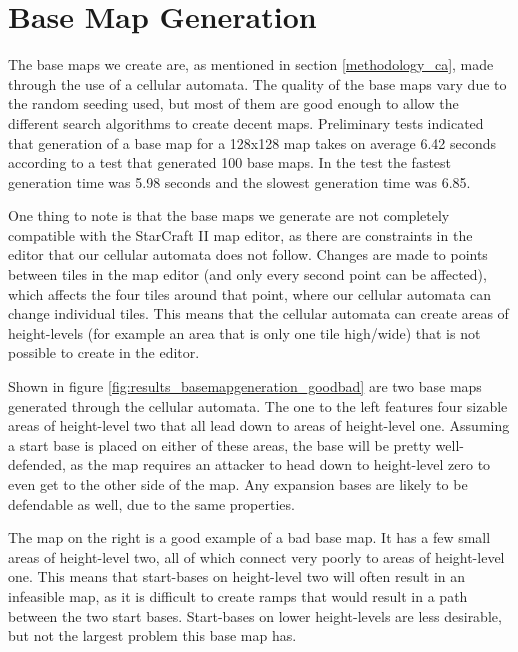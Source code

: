 \section{Base Map Generation}
\label{results_basemapgeneration}

The base maps we create are, as mentioned in section \ref{methodology_ca}, made through the use of a cellular automata. The quality of the base maps vary due to the random seeding used, but most of them are good enough to allow the different search algorithms to create decent maps. Preliminary tests indicated that generation of a base map for a 128x128 map takes on average 6.42 seconds according to a test that generated 100 base maps. In the test the fastest generation time was 5.98 seconds and the slowest generation time was 6.85.

One thing to note is that the base maps we generate are not completely compatible with the StarCraft II map editor, as there are constraints in the editor that our cellular automata does not follow. Changes are made to points between tiles in the map editor (and only every second point can be affected), which affects the four tiles around that point, where our cellular automata can change individual tiles. This means that the cellular automata can create areas of height-levels (for example an area that is only one tile high/wide) that is not possible to create in the editor.


Shown in figure \ref{fig:results_basemapgeneration_goodbad} are two base maps generated through the cellular automata. The one to the left features four sizable areas of height-level two that all lead down to areas of height-level one. Assuming a start base is placed on either of these areas, the base will be pretty well-defended, as the map requires an attacker to head down to height-level zero to even get to the other side of the map. Any expansion bases are likely to be defendable as well, due to the same properties.

The map on the right is a good example of a bad base map. It has a few small areas of height-level two, all of which connect very poorly to areas of height-level one. This means that start-bases on height-level two will often result in an infeasible map, as it is difficult to create ramps that would result in a path between the two start bases. Start-bases on lower height-levels are less desirable, but not the largest problem this base map has. 

